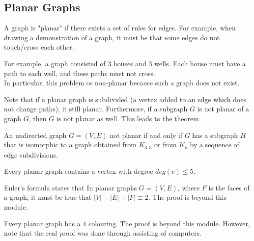 \documentclass[a4paper]{article}
\theoremstyle{plain}
\newtheorem{thm}{Theorem}[section]
\newtheorem{lem}[thm]{Lemma}
\theoremstyle{definition}
\newtheorem{defn}{Definition}[section]
\newtheorem{exmp}{Example}[section]
\theoremstyle{remark}
\begin{document}
\subsection{Planar Graphs}
\begin{tcolorbox}[colback=black!3!white,colframe=black!60!white,title=\begin{defn}Planar \label{Planar}\end{defn}]
A graph is "planar" if there exists a set of rules for edges. For example, when drawing a demonstration of a graph, it must be that some edges do not touch/cross each other.
\end{tcolorbox}
\begin{tcolorbox}[colback=black!3!white,colframe=black!60!white,title=\begin{exmp}Example 1 \label{Example 1}\end{exmp}]
        For example, a graph consisted of  $3$ houses and $3$ wells. Each house must have a path to each well, and these paths must not cross. \\
	In particular, this problem os non-planar because such a graph does not exist.
\end{tcolorbox}
Note that if a planar graph is subdivided (a vertex added to an edge which does not change paths), it still planar. Furthermore, if a subgraph $G$ is not planar of a graph $G$, then $G$ is not planar as well. This leads to the theorem
\begin{tcolorbox}[colback=black!3!white,colframe=black!60!white,title=\begin{thm}Kuratowski's Theorem \label{Kuratowski's Theorem}\end{thm}]
An undirected graph $G=(V,E)$ not planar if and only if $G$ has a subgraph $H$ that is isomorphic to a graph obtained from $K_{3,3}$ or from $K_5$ by a sequence of edge subdivisions.
\end{tcolorbox}
\begin{tcolorbox}[colback=black!3!white,colframe=black!60!white,title=\begin{lem}Degree of planars \label{Degree of planars}\end{lem}]
Every planar graph contains a vertex with degree $deg(v) \le 5$. 
\end{tcolorbox}
\begin{tcolorbox}[colback=black!3!white,colframe=black!60!white,title=\begin{thm}Euler's Formula \label{Euler's Formula}\end{thm}]
Euler's formula states that  In planar graphs $G=(V,E)$, where $F$ is the faces of a graph, it must be true that $|V|-|E|+|F| \equiv 2$. The proof is beyond this module.
\end{tcolorbox}
\begin{tcolorbox}[colback=black!3!white,colframe=black!60!white,title=\begin{thm}4-colouring \label{4-colouring}\end{thm}]
	Every planar graph has a $4$ colouring. The proof is beyond this module. However, note that the real proof was done through assisting of computers.
\end{tcolorbox}
\end{document}
